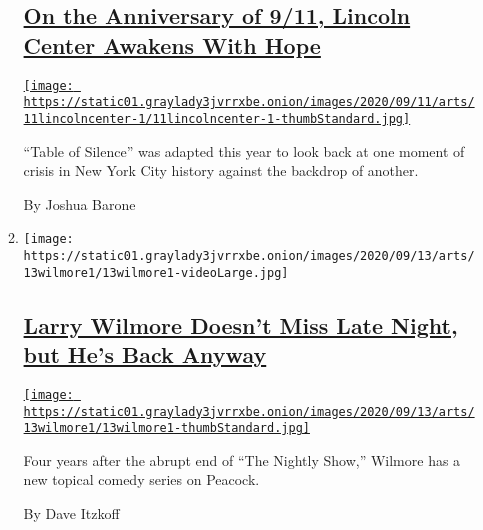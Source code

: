 \begin{enumerate}
\begin{enumerate}
    \hypertarget{on-the-anniversary-of-911-lincoln-center-awakens-with-hope}{%
    \subsection{\texorpdfstring{\href{/2020/09/11/arts/table-of-silence-9-11.html}{On
    the Anniversary of 9/11, Lincoln Center Awakens With
    Hope}}{On the Anniversary of 9/11, Lincoln Center Awakens With Hope}}\label{on-the-anniversary-of-911-lincoln-center-awakens-with-hope}}

    \href{/2020/09/11/arts/table-of-silence-9-11.html}{\texttt{[image: https://static01.graylady3jvrrxbe.onion/images/2020/09/11/arts/11lincolncenter-1/11lincolncenter-1-thumbStandard.jpg]}}

    ``Table of Silence'' was adapted this year to look back at one
    moment of crisis in New York City history against the backdrop of
    another.

    By Joshua Barone
  \item
    \texttt{[image: https://static01.graylady3jvrrxbe.onion/images/2020/09/13/arts/13wilmore1/13wilmore1-videoLarge.jpg]}

    \hypertarget{larry-wilmore-doesnt-miss-late-night-but-hes-back-anyway}{%
    \subsection{\texorpdfstring{\href{/2020/09/11/arts/television/larry-wilmore.html}{Larry
    Wilmore Doesn't Miss Late Night, but He's Back
    Anyway}}{Larry Wilmore Doesn't Miss Late Night, but He's Back Anyway}}\label{larry-wilmore-doesnt-miss-late-night-but-hes-back-anyway}}

    \href{/2020/09/11/arts/television/larry-wilmore.html}{\texttt{[image: https://static01.graylady3jvrrxbe.onion/images/2020/09/13/arts/13wilmore1/13wilmore1-thumbStandard.jpg]}}

    Four years after the abrupt end of ``The Nightly Show,'' Wilmore has
    a new topical comedy series on Peacock.

    By Dave Itzkoff
  \end{enumerate}
\end{enumerate}

